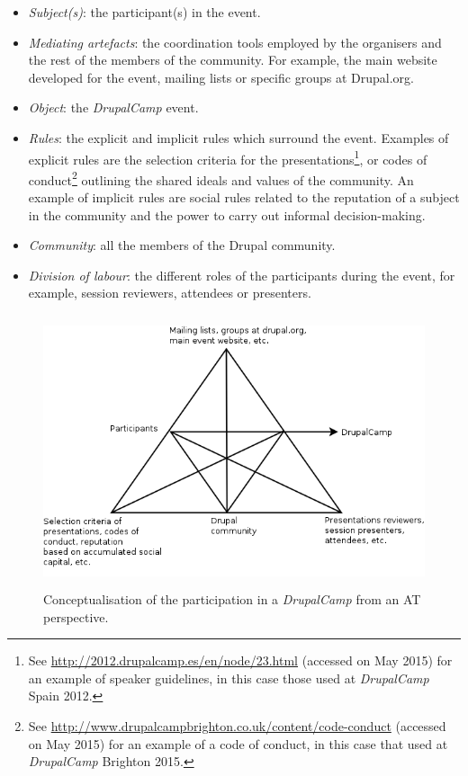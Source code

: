 \begin{itemize}
	\item \textit{Subject(s)}: the participant(s) in the event.
	\item \textit{Mediating artefacts}: the coordination tools employed by the organisers and the rest of the members of the community. For example, the main website developed for the event, mailing lists or specific groups at Drupal.org.	
	\item \textit{Object}: the \textit{DrupalCamp} event.
	\item \textit{Rules}: the explicit and implicit rules which surround the event. Examples of explicit rules are the selection criteria for the presentations\footnote{See \url{http://2012.drupalcamp.es/en/node/23.html} (accessed on  May 2015) for an example of speaker guidelines, in this case those used at \textit{DrupalCamp} Spain 2012.}, or codes of conduct\footnote{See \url{http://www.drupalcampbrighton.co.uk/content/code-conduct} (accessed on  May 2015) for an example of a code of conduct, in this case that used at \textit{DrupalCamp} Brighton 2015.} outlining the shared ideals and values of the community. An example of implicit rules are social rules related to the reputation of a subject in the community and the power to carry out informal decision-making.
	\item \textit{Community}: all the members of the Drupal community.
	\item \textit{Division of labour}: the different roles of the participants during the event, for example, session reviewers, attendees or presenters.
\end{itemize}


\begin{figure}[h]
	\centering
	\includegraphics[height=8cm]{diagrams/drupalcamp_at.png}
	\caption{Conceptualisation of the participation in a \textit{DrupalCamp} from an AT perspective.}
	\label{drupalcamp_at}
\end{figure}

